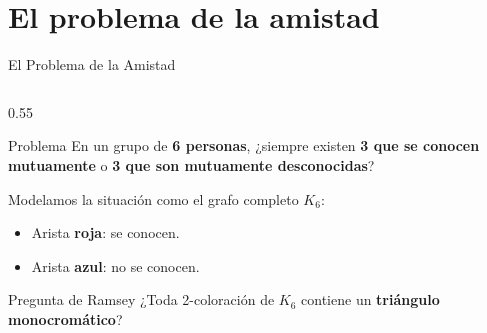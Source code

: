 
\section{El problema de la amistad}

\begin{frame}{El Problema de la Amistad}

    \begin{columns}[T]

        \begin{column}{0.55\textwidth}
            \begin{block}{Problema}
                En un grupo de \textbf{6 personas}, ¿siempre existen
                \textbf{3 que se conocen mutuamente} o \textbf{3 que
                son mutuamente desconocidas}?
            \end{block}

            \vspace{0.35cm}

            Modelamos la situación como el grafo completo $K_6$:
            \begin{itemize}
                \item Arista \textcolor{red!80!black}{\textbf{roja}}:
                      se conocen.
                \item Arista \textcolor{blue!80!black}{\textbf{azul}}:
                      no se conocen.
            \end{itemize}

            \vspace{0.3cm}

            \begin{alertblock}{Pregunta de Ramsey}
                ¿Toda 2-coloración de $K_6$ contiene un
                \textbf{triángulo monocromático}?
            \end{alertblock}
        \end{column}


\end{columns}
\end{frame}
